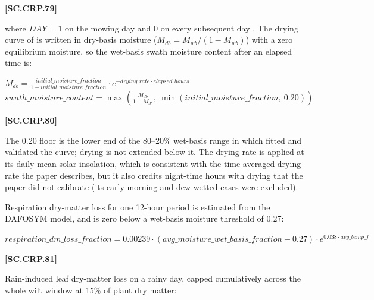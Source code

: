             {\raggedleft \textbf{[SC.CRP.79]}\par}
            \vspace{0.5cm}

where $DAY=1$ on the mowing day and $0$ on every subsequent day \citep{rotzchen1985}. The drying curve of \cite{rotzchen1985} is written in dry-basis moisture ($M_{db}=M_{wb}/(1-M_{wb})$) with a zero equilibrium moisture, so the wet-basis swath moisture content after an elapsed time is:
   \vspace{0.2cm}

    \begin{center}
        \(M_{db}= \frac{initial\_moisture\_fraction}{1-initial\_moisture\_fraction} \cdot e^{-drying\_rate \cdot elapsed\_hours}\)\
        \(swath\_moisture\_content= \max\left(\frac{M_{db}}{1+M_{db}},\ \min(initial\_moisture\_fraction,\ 0.20)\right)\)
    \end{center}
        \vspace{0.5cm}

            {\raggedleft \textbf{[SC.CRP.80]}\par}
            \vspace{0.5cm}

The 0.20 floor is the lower end of the 80--20\% wet-basis range in which \cite{rotzchen1985} fitted and validated the curve; drying is not extended below it. The drying rate is applied at its daily-mean solar insolation, which is consistent with the time-averaged drying rate the paper describes, but it also credits night-time hours with drying that the paper did not calibrate (its early-morning and dew-wetted cases were excluded).

Respiration dry-matter loss for one 12-hour period is estimated from the DAFOSYM model, and is zero below a wet-basis moisture threshold of 0.27:
   \vspace{0.2cm}

    \begin{center}
        \(respiration\_dm\_loss\_fraction= 0.00239 \cdot (avg\_moisture\_wet\_basis\_fraction-0.27) \cdot e^{0.038 \cdot avg\_temp\_f}\)
    \end{center}
        \vspace{0.5cm}

            {\raggedleft \textbf{[SC.CRP.81]}\par}
            \vspace{0.5cm}

Rain-induced leaf dry-matter loss on a rainy day, capped cumulatively across the whole wilt window at 15\% of plant dry matter:
   \vspace{0.2cm}


